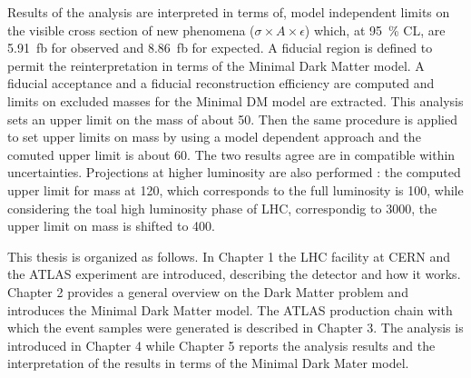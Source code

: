 Results of the \mph analysis are interpreted in terms of, model independent limits on the visible cross section of new phenomena ($\sigma\times A\times\epsilon$) which, at \SI{95}{\percent} CL, are \SI{5.91}{fb} for observed and \SI{8.86}{fb} for expected. A fiducial region is defined to permit the reinterpretation in terms of the Minimal Dark Matter model. A fiducial acceptance and a fiducial reconstruction efficiency are computed and limits on excluded masses for the Minimal DM model are extracted. This analysis sets an upper limit on the \chizero mass of about \SI{50}{\gev}.
Then the same procedure is applied to set upper limits on \chizero mass by using a model dependent approach and the comuted upper limit is about \SI{60}{\gev}. The two results agree are in compatible within uncertainties.
Projections at higher luminosity are also performed : the computed upper limit for \chizero mass at \SI{120}{\ifb}, which corresponds to the full \RunTwo luminosity is \SI{100}{\gev}, while considering the toal high luminosity phase of LHC, correspondig to \SI{3000}{\ifb}, the upper limit on \chizero mass is shifted to \SI{400}{\gev}.

\bigskip
  
This thesis is organized as follows. In Chapter 1 the LHC facility at CERN and the ATLAS experiment are introduced, describing the detector and how it works. Chapter 2 provides a general overview on the Dark Matter problem and introduces the Minimal Dark Matter model. The ATLAS production chain with which the event samples were generated is described in Chapter 3. The \mph analysis is introduced in Chapter 4 while Chapter 5 reports the analysis results and the interpretation of the \mph results in terms of the Minimal Dark Mater model.



